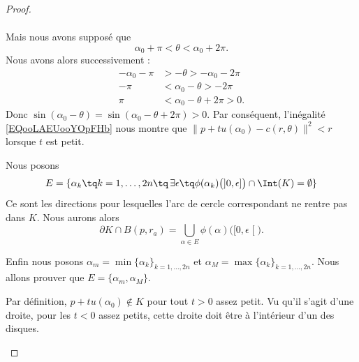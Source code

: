 \begin{proof}
\begin{subproof}
\begin{subequations}
\begin{align}
				\end{align}
			\end{subequations}
			Mais nous avons supposé que
			\begin{equation}
				\alpha_0+\pi<\theta<\alpha_0+2\pi.
			\end{equation}
			Nous avons alors successivement :
			\begin{subequations}
				\begin{align}
					-\alpha_0-\pi & >-\theta               >-\alpha_0-2\pi \\
					-\pi          & <\alpha_0-\theta       >-2\pi          \\
					\pi           & <\alpha_0-\theta+2\pi  >0.
				\end{align}
			\end{subequations}
			Donc \( \sin(\alpha_0-\theta)=\sin(\alpha_0-\theta+2\pi)>0\). Par conséquent, l'inégalité \eqref{EQooLAEUooYOpFHb} nous montre que \( \| p+tu(\alpha_0)-c(r,\theta) \|^2<r\) lorsque \( t\) est petit.

			Nous posons
			\begin{equation}
				E=\{ \alpha_k\tq k=1,\ldots,2n\tq\,\exists\epsilon\tq \phi(\alpha_k)\big( \mathopen] 0,\epsilon\mathclose] \big)\cap \Int(K)=\emptyset \}
			\end{equation}
			Ce sont les directions pour lesquelles l'arc de cercle correspondant ne rentre pas dans \( K\). Nous aurons alors
			\begin{equation}
				\partial K\cap B(p,r_a)=\bigcup_{\alpha\in E}\phi(\alpha)\big( \mathopen[ 0,\epsilon\mathclose[ \big).
			\end{equation}

			Enfin nous posons \( \alpha_m=\min\{ \alpha_k \}_{k=1,\ldots,2n}\) et \( \alpha_M=\max\{ \alpha_k \}_{k=1,\ldots,2n}\). Nous allons prouver que \( E=\{ \alpha_m,\alpha_M \}\).

			Par définition, \( p+tu(\alpha_0)\not\in K\) pour tout \( t>0\) assez petit. Vu qu'il s'agit d'une droite, pour les \( t<0\) assez petits, cette droite doit être à l'intérieur d'un des disques.


\end{subproof}
\end{proof}
